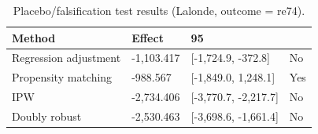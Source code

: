 \begin{table}[t!]
\centering
\footnotesize
\caption{Placebo/falsification test results (Lalonde, outcome = re74).}
\label{tab:paper-placebo-test}
\setlength{\tabcolsep}{4.5pt}
\begin{tabular}{llll}
\hline
Method & Effect & 95\\%
\hline
Regression adjustment & -1,103.417 & [-1,724.9, -372.8] & No \\
Propensity matching & -988.567 & [-1,849.0, 1,248.1] & Yes \\
IPW & -2,734.406 & [-3,770.7, -2,217.7] & No \\
Doubly robust & -2,530.463 & [-3,698.6, -1,661.4] & No \\
\hline
\end{tabular}
\end{table}

